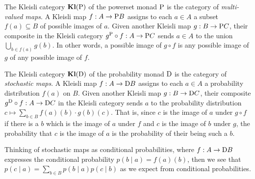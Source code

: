\documentclass[DynamicalBook]{subfiles}
\begin{document}
\begin{example}\label{ex.powerset_kleisli}
  The Kleisli category $\textbf{Kl}(\mathrm{P})$ of the powerset monad $\mathrm{P}$ is
  the category of \emph{multi-valued maps}. A Kleisli map $f : A \to
  \mathrm{P} B$ assigns to each $a \in A$ a subset $f(a) \subseteq B$ of possible
  images of $a$. Given another Kleisli map $g : B \to \mathrm{P} C$, their
  composite in the Kleisli category $g^{\mathrm{P}} \circ f : A \to \mathrm{P} C$
  sends $a \in A$ to the union $\bigcup_{b \in f(a)} g(b)$. In other words, a
  possible image of $g \circ f$ is any possible image of $g$ of any possible
  image of $f$.
\end{example}

\begin{example}\label{ex.probset_kleisli}
  The Kleisli category $\textbf{Kl}(\mathrm{D})$ of the probability monad $\mathrm{D}$
  is the category of \emph{stochastic maps}. A Kleisli map $f : A \to \mathrm{D}
  B$ assigns to each $a \in A$ a probability distribution $f(a)$ on $B$. Given
  another Kleisli map $g : B \to \mathrm{D} C$, their composite $g^{\mathrm{D}}
  \circ f : A \to \mathrm{D} C$ in the Kleisli category sends $a$ to the
  probability distribution $c \mapsto \sum_{b \in B}
  f(a)(b) \cdot g(b)(c)$. That is, since $c$ is the image of $a$ under $g \circ f$ if there is a $b$ which
  is the image of $a$ under $f$ and $c$ is the image of $b$ under $g$, the
  probability that $c$ is the image of $a$ is the probability of their being
  such a $b$.

  Thinking of stochastic maps as conditional probabilities, where $f : A \to
  \mathrm{D} B$ expresses the conditional probability $p(b \mid a) = f(a)(b)$,
  then we see that
  $p(c \mid a) = \sum_{b \in B} p(b \mid a) p(c \mid b)$
  as we expect from conditional probabilities.
\end{example}
\end{document}
